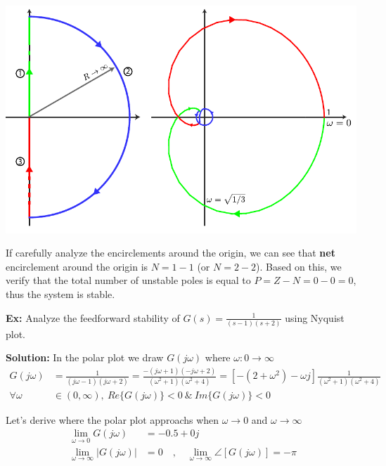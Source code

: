 \documentclass[twoside]{article}
\begin{document}
  \begin{minipage}[h]{1\linewidth}
    \begin{center}
      \includegraphics[width=0.99\textwidth]{ex4}
    \end{center}
  \end{minipage}

\vspace{6 pt}

If carefully analyze the encirclements around the origin, 
we can see that \textbf{net} encirclement around the origin is 
$N = 1 - 1$ (or $N = 2 - 2$). Based on this, we verify that   
the total number of unstable poles is equal to
$P = Z - N = 0 - 0 = 0$, thus the system is stable. 

\newpage

\textbf{Ex:} Analyze the feedforward stability of $G(s) =
\frac{1}{ (s-1)(s+ 2)}$ using Nyquist plot. 

\textbf{Solution:} In the polar plot we draw $G(j \omega)$ where $\omega : 0 \to \infty$
%
\begin{align*}
  G(j \omega) &= \frac{1}{ (j \omega - 1) (j \omega + 2) } = 
  \frac{-(j \omega + 1) (-j \omega + 2)}{ (\omega^2 + 1) (\omega^2 +
  4) } = \left[ -(2+\omega^2) - \omega j \right] \frac{1}{(\omega^2 + 1) (\omega^2 +
  4)}
\\
\forall \omega &\in (0 , \infty) , \ Re \lbrace G(j \omega)
  \rbrace < 0 \ \& \ Im \lbrace G(j \omega)
  \rbrace < 0
\end{align*}

Let's derive where the polar plot approachs when $\omega \to 0$
and $\omega \to \infty$
\begin{align*}
  \lim_{\omega \to 0} G(j \omega) &= -0.5 + 0 j
\\
  \lim_{\omega \to \infty} | G(j \omega) | &= 0
\quad , \quad
 \lim_{\omega \to \infty} \angle [ G(j \omega) ] = -\pi
\end{align*}
\end{document}
